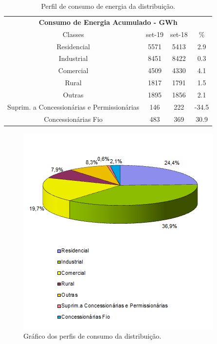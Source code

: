 \documentclass[grad,numbers]{coppe}
\begin{document}
  \begin{table}[H]

  \caption{\label{tab:unnamed-chunk-11}Perfil de consumo de energia da distribuição.}
  \centering
  \begin{tabular}[t]{cccc}
  \toprule
  \multicolumn{4}{c}{\textbf{Consumo de Energia Acumulado - GWh}} \\
  \cmidrule(l{3pt}r{3pt}){1-4}
  Classes & set-19 & set-18 & \%\\
  \midrule
  Residencial & 5571 & 5413 & 2.9\\
  Industrial & 8451 & 8422 & 0.3\\
  Comercial & 4509 & 4330 & 4.1\\
  Rural & 1817 & 1791 & 1.5\\
  Outras & 1895 & 1856 & 2.1\\
  \addlinespace
  Suprim. a Concessionárias e Permissionárias & 146 & 222 & -34.5\\
  Concessionárias Fio & 483 & 369 & 30.9\\
  \bottomrule
  \end{tabular}
  \end{table}
  \begin{figure}[H]
  \includegraphics[width=1\linewidth]{img/consumo_dist} \caption{Gráfico dos perfis de consumo da distribuição.}\label{fig:unnamed-chunk-12}
  \end{figure}
\end{document}
